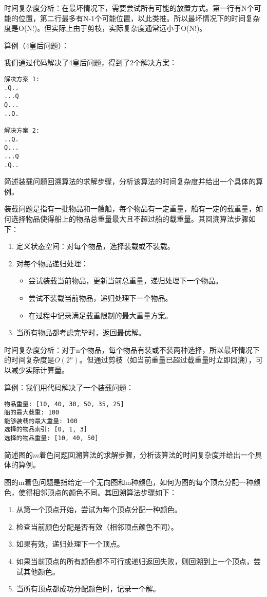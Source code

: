 \documentclass[12pt,twoside]{article}
\begin{document}
\begin{problems}
时间复杂度分析：在最坏情况下，需要尝试所有可能的放置方式。第一行有N个可能的位置，第二行最多有N-1个可能位置，以此类推。所以最坏情况下的时间复杂度是O(N!)。但实际上由于剪枝，实际复杂度通常远小于O(N!)。

算例（4皇后问题）：

我们通过代码解决了4皇后问题，得到了2个解决方案：
\begin{verbatim}
解决方案 1:
.Q..
...Q
Q...
..Q.

解决方案 2:
..Q.
Q...
...Q
.Q..
\end{verbatim}

\ppart 简述装载问题回溯算法的求解步骤，分析该算法的时间复杂度并给出一个具体的算例。

装载问题是指有一批物品和一艘船，每个物品有一定重量，船有一定的载重量，如何选择物品使得船上的物品总重量最大且不超过船的载重量。其回溯算法步骤如下：

\begin{enumerate}
    \item 定义状态空间：对每个物品，选择装载或不装载。
    \item 对每个物品递归处理：
    \begin{itemize}
        \item 尝试装载当前物品，更新当前总重量，递归处理下一个物品。
        \item 尝试不装载当前物品，递归处理下一个物品。
        \item 在过程中记录满足载重限制的最大重量方案。
    \end{itemize}
    \item 当所有物品都考虑完毕时，返回最优解。
\end{enumerate}

时间复杂度分析：对于n个物品，每个物品有装或不装两种选择，所以最坏情况下的时间复杂度是$O(2^n)$。但通过剪枝（如当前重量已超过载重量时立即回溯），可以减少实际计算量。

算例：我们用代码解决了一个装载问题：
\begin{verbatim}
物品重量: [10, 40, 30, 50, 35, 25]
船的最大载重: 100
能够装载的最大重量: 100
选择的物品索引: [0, 1, 3]
选择的物品重量: [10, 40, 50]
\end{verbatim}

\ppart 简述图的$m$着色问题回溯算法的求解步骤，分析该算法的时间复杂度并给出一个具体的算例。

图的m着色问题是指给定一个无向图和m种颜色，如何为图的每个顶点分配一种颜色，使得相邻顶点的颜色不同。其回溯算法步骤如下：

\begin{enumerate}
    \item 从第一个顶点开始，尝试为每个顶点分配一种颜色。
    \item 检查当前颜色分配是否有效（相邻顶点颜色不同）。
    \item 如果有效，递归处理下一个顶点。
    \item 如果当前顶点的所有颜色都不可行或递归返回失败，则回溯到上一个顶点，尝试其他颜色。
    \item 当所有顶点都成功分配颜色时，记录一个解。
\end{enumerate}


\end{problems}
\end{document}
